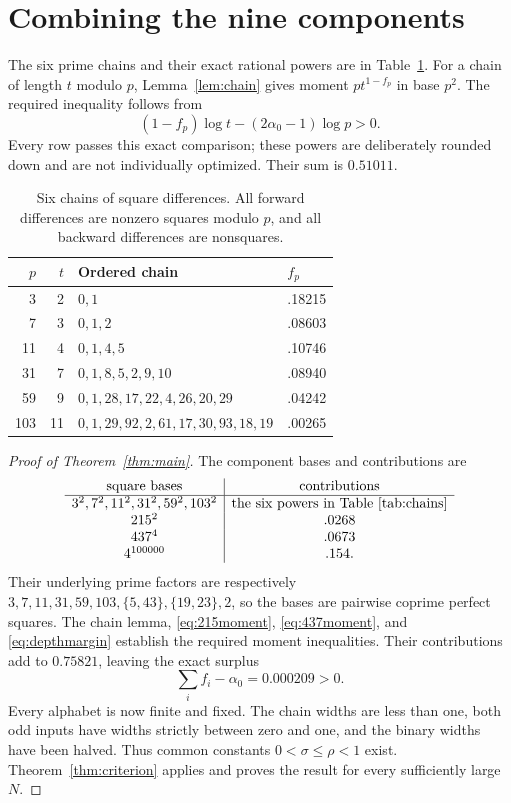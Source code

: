 \documentclass[11pt]{article}
\theoremstyle{definition}
\theoremstyle{remark}
\newcommand{\al}{\alpha_0}
\begin{document}
\section{Combining the nine components}\label{sec:parameters}
The six prime chains and their exact rational powers are in
Table~\ref{tab:chains}. For a chain of length $t$ modulo $p$,
Lemma~\ref{lem:chain} gives moment $pt^{1-f_p}$ in base $p^2$.
The required inequality follows from
\[
 (1-f_p)\log t-(2\al-1)\log p>0.
\]
Every row passes this exact comparison; these powers are deliberately
rounded down and are not individually optimized. Their sum is $0.51011$.
\begin{table}[ht]
\centering
\begin{tabular}{rrll}\toprule
$p$&$t$&Ordered chain&$f_p$\\\midrule
3&2&$0,1$&.18215\\
7&3&$0,1,2$&.08603\\
11&4&$0,1,4,5$&.10746\\
31&7&$0,1,8,5,2,9,10$&.08940\\
59&9&$0,1,28,17,22,4,26,20,29$&.04242\\
103&11&$0,1,29,92,2,61,17,30,93,18,19$&.00265\\\bottomrule
\end{tabular}
\caption{Six chains of square differences. All forward differences are
nonzero squares modulo $p$, and all backward differences are nonsquares.}
\label{tab:chains}
\end{table}

\begin{proof}[Proof of Theorem~\ref{thm:main}]
The component bases and contributions are
\[
\begin{array}{c|c}
\text{square bases}&\text{contributions}\\\hline
3^2,7^2,11^2,31^2,59^2,103^2&\text{the six powers in Table~\ref{tab:chains}}\\
215^2&.0268\\
437^4&.0673\\
4^{100000}&.154.
\end{array}
\]
Their underlying prime factors are respectively
$3,7,11,31,59,103,\{5,43\},\{19,23\},2$, so the bases are pairwise
coprime perfect squares. The chain lemma,
\eqref{eq:215moment}, \eqref{eq:437moment}, and
\eqref{eq:depthmargin} establish the required moment inequalities.
Their contributions add to $0.75821$, leaving the exact surplus
\[
 \sum_i f_i-\al=0.000209>0.
\]
Every alphabet is now finite and fixed. The chain widths are less than
one, both odd inputs have widths strictly between zero and one, and the
binary widths have been halved. Thus common constants
$0<\sigma\le\rho<1$ exist. Theorem~\ref{thm:criterion} applies and
proves the result for every sufficiently large $N$.
\end{proof}
\end{document}

